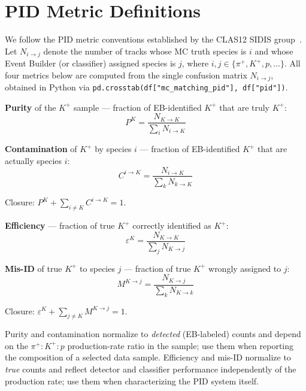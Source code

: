 \documentclass[11pt]{article}
\newcommand{\Kp}{K^{+}}
\newcommand{\pip}{\pi^{+}}
\begin{document}
\section{PID Metric Definitions}
\label{sec:metrics}

We follow the PID metric conventions established by the CLAS12 SIDIS
group~\cite{Mirazita2026}.
Let $N_{i \to j}$ denote the number of tracks whose MC truth species is $i$
and whose Event Builder (or classifier) assigned species is $j$, where
$i, j \in \{\pip, \Kp, p, \ldots\}$.
All four metrics below are computed from the single confusion matrix
$N_{i \to j}$, obtained in Python via
\texttt{pd.crosstab(df["mc\_matching\_pid"], df["pid"])}.

\textbf{Purity} of the $\Kp$ sample --- fraction of EB-identified $\Kp$ that
are truly $\Kp$:
\[
  P^{K} = \frac{N_{K \to K}}{\displaystyle\sum_{i} N_{i \to K}}
\]

\textbf{Contamination} of $\Kp$ by species $i$ --- fraction of EB-identified
$\Kp$ that are actually species $i$:
\[
  C^{i \to K} = \frac{N_{i \to K}}{\displaystyle\sum_{k} N_{k \to K}}
\]

Closure: $P^{K} + \sum_{i \neq K} C^{i \to K} = 1$.

\textbf{Efficiency} --- fraction of true $\Kp$ correctly identified as $\Kp$:
\[
  \varepsilon^{K} = \frac{N_{K \to K}}{\displaystyle\sum_{j} N_{K \to j}}
\]

\textbf{Mis-ID} of true $\Kp$ to species $j$ --- fraction of true $\Kp$ wrongly
assigned to $j$:
\[
  M^{K \to j} = \frac{N_{K \to j}}{\displaystyle\sum_{k} N_{K \to k}}
\]

Closure: $\varepsilon^{K} + \sum_{j \neq K} M^{K \to j} = 1$.

Purity and contamination normalize to \emph{detected} (EB-labeled) counts and
depend on the $\pip{:}\Kp{:}p$ production-rate ratio in the sample; use them
when reporting the composition of a selected data sample.
Efficiency and mis-ID normalize to \emph{true} counts and reflect detector
and classifier performance independently of the production rate; use them when
characterizing the PID system itself.
\end{document}
